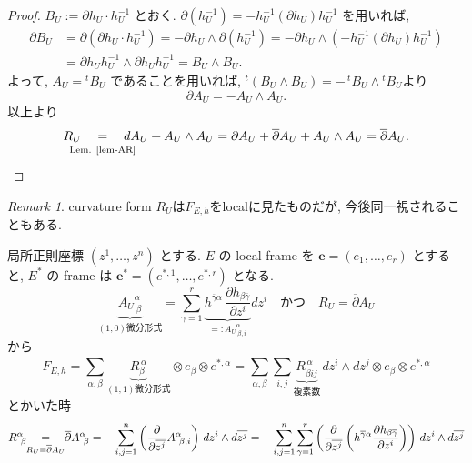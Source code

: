 \documentclass[dvipdfmx,a4paper,11pt]{article} %
\theoremstyle{definition}
\theoremstyle{remark}
\newtheorem{rem}[thm]{Remark}
\numberwithin{equation}{section}
\newcommand{\underalign}[2]{\quad \underset{\mathclap{\strut #1}}{#2}\quad}
\begin{document}
\begin{proof}
\(
B_U
:=
\partial h_U\cdot h_U^{-1}
\)
とおく. 
\(
\partial(h_U^{-1})
=
-h_U^{-1}(\partial h_U)h_U^{-1}
\)
を用いれば, 
\[
\begin{aligned}
\partial B_U
&=
\partial\left(\partial h_U\cdot h_U^{-1}\right)
=
-
\partial h_U\wedge \partial(h_U^{-1})
=
-
\partial h_U\wedge
\left(
-h_U^{-1}(\partial h_U)h_U^{-1}
\right)
\\
&=
\partial h_U h_U^{-1}
\wedge
\partial h_U h_U^{-1}
=
B_U\wedge B_U.
\end{aligned}
\]
よって, 
\(
A_U={}^tB_U
\)
であることを用いれば, ${}^t(B_U\wedge B_U)
=
-\,{}^tB_U\wedge{}^tB_U$より
$$
\partial A_U
=-A_U\wedge A_U.
$$
 以上より
\[
\begin{aligned}
R_U
\underalign{\text{Lem. \ref{lem-AR}}}{=}
dA_U+A_U\wedge A_U
=
\partial A_U+\overline{\partial}A_U
+
A_U\wedge A_U
=
\overline{\partial}A_U.
\end{aligned}
\]
\end{proof}
\begin{rem}
curvature form $R_U$は$F_{E,h}$をlocalに見たものだが, 今後同一視されることもある.
\end{rem}


局所正則座標 \((z^1,\ldots,z^n)\) とする.
 \(E\) の local frame を \(\mathbf{e}=(e_1, \ldots, e_r)\) とすると, \(E^*\) の frame は
\(\mathbf{e}^{*}=(e^{*, 1}, \ldots, e^{*, r})\) となる. 
\begin{equation}
\underbrace{{A_U}^\alpha_{\ \beta}}_{\text{$(1,0)$微分形式}}
=
\sum_{\gamma=1}^{r}
\underbrace{
h^{\overline\gamma\alpha}\,
\frac{\partial h_{\beta\overline\gamma}}{\partial z^i} 
}_{=: {A_U}^\alpha_{\ \beta,i}}
dz^i
\quad \text{かつ}\quad 
R_U=
\overline{\partial}A_U
\end{equation}
から
\[
F_{E,h}=
\sum_{\alpha,\beta}
\underbrace{R_\beta^{\,\alpha}}_{\text{$(1,1)$微分形式}}
\otimes 
e_{\beta} \otimes e^{*,\alpha}
=\sum_{\alpha,\beta}\sum_{i,j} 
\underbrace{R_{\beta i\overline{j}}^{\,\alpha}}_{\text{複素数}}\,dz^i\wedge d\overline{z^j} 
\otimes e_{\beta} \otimes e^{*, \alpha}
\]
とかいた時
\begin{equation}
\label{eq-Rij-for}
R^\alpha_{\ \beta}
\underalign{R_{U}=
\overline{\partial}A_{U}}{=}
\overline\partial A^\alpha_{\ \beta}
=
-
\sum_{i,j=1}^{n}
\left(\frac{\partial}{\partial \overline{z^j}}A^\alpha_{\ \beta,i}\right)
\,dz^i\wedge d\overline{z^j}
=
-
\sum_{i,j=1}^{n}
\sum_{\gamma=1}^{r}
\left(\frac{\partial}{\partial \overline{z^j}}\left(h^{\overline\gamma\alpha}
\frac{\partial h_{\beta\overline\gamma}}{\partial z^i} \right)\right)
\,dz^i\wedge d\overline{z^j}
\end{equation}
\end{document}
